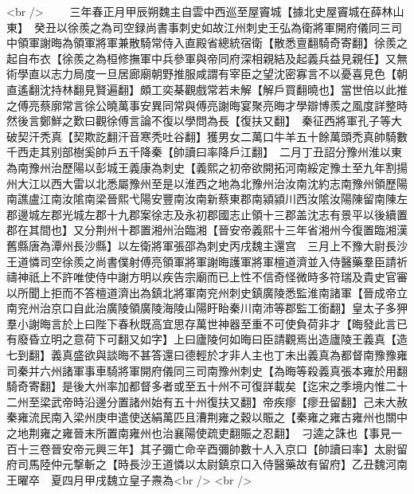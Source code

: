 <br />
　　三年春正月甲辰朔魏主自雲中西巡至屋竇城【據北史屋竇城在薛林山東】　癸丑以徐羨之為司空録尚書事刺史如故江州刺史王弘為衛將軍開府儀同三司中領軍謝晦為領軍將軍兼散騎常侍入直殿省總統宿衛【散悉亶翻騎奇寄翻】徐羨之起自布衣【徐羨之為桓修撫軍中兵參軍與帝同府深相親結及起義兵益見親任】又無術學直以志力局度一旦居廊廟朝野推服咸謂有宰臣之望沈密寡言不以憂喜見色【朝直遙翻沈持林翻見賢遍翻】頗工奕棊觀戲常若未解【解戶買翻曉也】當世倍以此推之傅亮蔡廓常言徐公曉萬事安異同常與傅亮謝晦宴聚亮晦才學辯博羨之風度詳整時然後言鄭鮮之歎曰觀徐傅言論不復以學問為長【復扶又翻】　秦征西將軍孔子等大破契汗秃真【契欺訖翻汗音寒秃吐谷翻】獲男女二萬口牛羊五十餘萬頭禿真帥騎數千西走其别部樹奚帥戶五千降秦【帥讀曰率降戶江翻】　二月丁丑詔分豫州淮以東為南豫州治歷陽以彭城王義康為刺史【義熙之初帝欲開拓河南綏定豫土至九年割揚州大江以西大雷以北悉屬豫州至是以淮西之地為北豫州治汝南沈約志南豫州領歷陽南譙盧江南汝隂南梁晉熙弋陽安豐南汝南新蔡東郡南潁潁川西汝隂汝陽陳留南陳左郡邊城左郡光城左郡十九郡案徐志及永初郡國志止領十三郡盖沈志有景平以後續置郡在其間也】又分荆州十郡置湘州治臨湘【晉安帝義熙十三年省湘州今復置臨湘漢舊縣唐為潭州長沙縣】以左衛將軍張邵為刺史丙戌魏主還宫　三月上不豫大尉長沙王道憐司空徐羨之尚書僕射傅亮領軍將軍謝晦護軍將軍檀道濟並入侍醫藥羣臣請祈禱神祇上不許唯使侍中謝方明以疾告宗廟而已上性不信奇怪微時多符瑞及貴史官審以所聞上拒而不答檀道濟出為鎮北將軍南兖州刺史鎮廣陵悉監淮南諸軍【晉成帝立南兖州治京口自此治廣陵領廣陵海陵山陽盱眙秦川南沛等郡監工銜翻】皇太子多狎羣小謝晦言於上曰陛下春秋既高宜思存萬世神器至重不可使負荷非才【晦發此言已有廢昏立明之意荷下可翻又如字】上曰廬陵何如晦曰臣請觀焉出造廬陵王義真【造七到翻】義真盛欲與談晦不甚答還曰德輕於才非人主也丁未出義真為都督南豫豫雍司秦并六州諸軍事車騎將軍開府儀同三司南豫州刺史【為晦等殺義真張本雍於用翻騎奇寄翻】是後大州率加都督多者或至五十州不可復詳載矣【迄宋之季境内惟二十二州至梁武帝時沿邊分置諸州始有五十州復扶又翻】帝疾瘳【瘳丑留翻】己未大赦　秦雍流民南入梁州庚申遣使送絹萬匹且漕荆雍之穀以賑之【秦雍之雍古雍州也關中之地荆雍之雍晉末所置南雍州也治襄陽使疏吏翻賑之忍翻】　刁逵之誅也【事見一百十三卷晉安帝元興三年】其子彌亡命辛酉彌帥數十人入京口【帥讀曰率】太尉留府司馬陸仲元撃斬之【時長沙王道憐以太尉鎮京口入侍醫藥故有留府】乙丑魏河南王曜卒　夏四月甲戌魏立皇子燾為<br />
<br />
